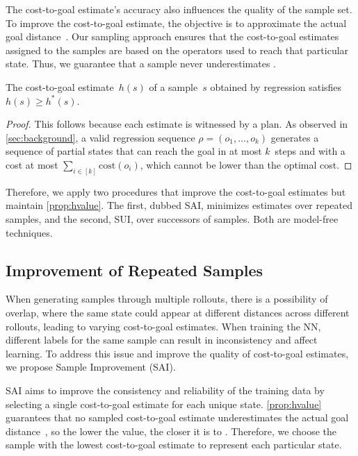 The cost-to-goal estimate's accuracy also influences the quality of the sample set. To improve the cost-to-goal estimate, the objective is to approximate the actual goal distance~\hstar{}. Our sampling approach ensures that the cost-to-goal estimates assigned to the samples are based on the operators used to reach that particular state. Thus, we guarantee that a sample never underestimates \hstar.

\begin{property}
    \label{prop:hvalue}
    The cost-to-goal estimate~$h(s)$ of a sample~$s$ obtained by regression satisfies $h(s)\geq h^*(s)$.
\end{property}
\begin{proof}
    This follows because each estimate is witnessed by a plan. As observed in \cref{sec:background}, a valid regression sequence $\rho=(o_1,\ldots,o_k)$ generates a sequence of partial states that can reach the goal in at most $k$~steps and with a cost at most $\sum_{i\in[k]}\text{cost}(o_i)$, which cannot be lower than the optimal cost.
\end{proof}

Therefore, we apply two procedures that improve the cost-to-goal estimates but maintain \cref{prop:hvalue}. The first, dubbed SAI, minimizes estimates over repeated samples, and the second, SUI, over successors of samples. Both are model-free techniques.

\subsection{Improvement of Repeated Samples}
\label{sec:sai}

When generating samples through multiple rollouts, there is a possibility of overlap, where the same state could appear at different distances across different rollouts, leading to varying cost-to-goal estimates. When training the NN, different labels for the same sample can result in inconsistency and affect learning. To address this issue and improve the quality of cost-to-goal estimates, we propose Sample Improvement (SAI).

SAI aims to improve the consistency and reliability of the training data by selecting a single cost-to-goal estimate for each unique state. \cref{prop:hvalue} guarantees that no sampled cost-to-goal estimate underestimates the actual goal distance~\hstar, so the lower the value, the closer it is to \hstar. Therefore, we choose the sample with the lowest cost-to-goal estimate to represent each particular state.

